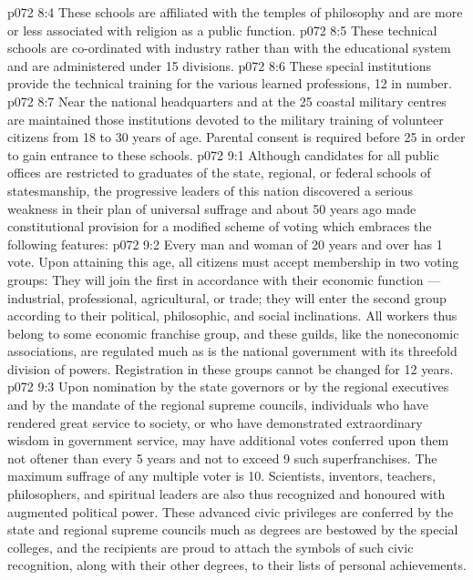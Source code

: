 \vs p072 8:4 \bibnobreakspace {} These schools are affiliated with the temples of philosophy and are more or less associated with religion as a public function.
\vs p072 8:5 \bibnobreakspace {} These technical schools are co\hyp{}ordinated with industry rather than with the educational system and are administered under 15 divisions.
\vs p072 8:6 \bibnobreakspace {} These special institutions provide the technical training for the various learned professions, 12 in number.
\vs p072 8:7 \bibnobreakspace {} Near the national headquarters and at the 25 coastal military centres are maintained those institutions devoted to the military training of volunteer citizens from 18 to 30 years of age. Parental consent is required before 25 in order to gain entrance to these schools.
\vs p072 9:1 Although candidates for all public offices are restricted to graduates of the state, regional, or federal schools of statesmanship, the progressive leaders of this nation discovered a serious weakness in their plan of universal suffrage and about 50 years ago made constitutional provision for a modified scheme of voting which embraces the following features:
\vs p072 9:2 \bibnobreakspace Every man and woman of 20 years and over has 1 vote. Upon attaining this age, all citizens must accept membership in two voting groups: They will join the first in accordance with their economic function --- industrial, professional, agricultural, or trade; they will enter the second group according to their political, philosophic, and social inclinations. All workers thus belong to some economic franchise group, and these guilds, like the noneconomic associations, are regulated much as is the national government with its threefold division of powers. Registration in these groups cannot be changed for 12 years.
\vs p072 9:3 \bibnobreakspace Upon nomination by the state governors or by the regional executives and by the mandate of the regional supreme councils, individuals who have rendered great service to society, or who have demonstrated extraordinary wisdom in government service, may have additional votes conferred upon them not oftener than every 5 years and not to exceed 9 such superfranchises. The maximum suffrage of any multiple voter is 10. Scientists, inventors, teachers, philosophers, and spiritual leaders are also thus recognized and honoured with augmented political power. These advanced civic privileges are conferred by the state and regional supreme councils much as degrees are bestowed by the special colleges, and the recipients are proud to attach the symbols of such civic recognition, along with their other degrees, to their lists of personal achievements.
